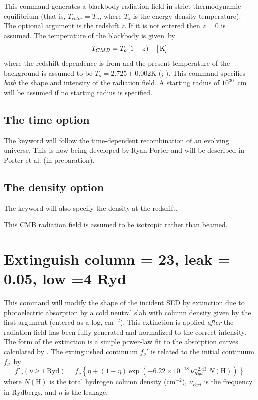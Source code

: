 This command generates a blackbody radiation field in strict thermodynamic
equilibrium (that is, $T_{color} = T_u$, where $T_u$ is the energy-density
temperature).  The optional argument is the redshift $z$.
If it is not entered then $z = 0$ is assumed.
The temperature of the blackbody is given~by
\begin{equation}
T_{CMB}  = T_o \left( {1 + z} \right)\quad [{\rm\thinspace K}]
\end{equation}
where the redshift dependence is from \citet{Peebles1971} and the present
temperature of the background is assumed to be $T_o = 2.725\pm 0.002$K
(\citealp{Mather1999}; \citealp{Wilkinson1987}).
This command specifies \emph{both} the shape and
intensity of the radiation field.
A starting radius of $10^{30}$~cm will be
assumed if no starting radius is specified.

\begin{shaded}
\subsection{\experimental The time option}
The keyword  will follow the time-dependent
recombination of an evolving universe.
This is now being developed by Ryan Porter and will be described in
Porter et al. (in preparation).

\subsection{\experimental The density option}
The keyword  will also specify the density at
the redshift.
\end{shaded}

This CMB radiation field is assumed to be isotropic rather than beamed.

\section{Extinguish column = 23, leak = 0.05, low  =4 Ryd}

This command will modify the shape of the
incident SED by extinction due
to photoelectric absorption by a cold neutral slab with column density given
by the first argument (entered as a log, cm$^{-2}$).
This extinction is applied \emph{after} the
radiation field has been fully generated and normalized
to the correct intensity.
The form of the extinction is a simple power-law fit to the
absorption curves calculated by \citet{Cruddace1974}.
The extinguished continuum $f_\nu'$ is
related to the initial continuum $f_\nu$~by
\begin{equation}
f'_\nu  \left( {\nu  \ge 1\,{\mathrm{Ryd}}} \right) = f_\nu  \left\{ {\eta
+ \left( {1 - \eta } \right)\exp \left( { - 6.22 \times 10^{ - 18} \,\nu
_{Ryd}^{ - 2.43} \;N\left( {\mathrm{H}} \right)} \right)} \right\}%
\end{equation}
where $N(\mathrm{H})$ is the total hydrogen column density (cm$^{-2}$), $\nu_{Ryd}$ is the frequency
in Rydbergs, and $\eta$ is the leakage.

